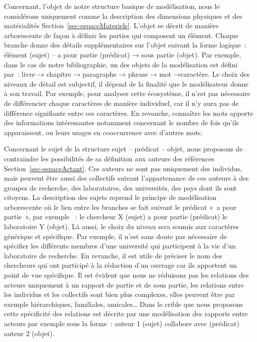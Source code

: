 \documentclass[
  letterpaper,
  DIV=11,
  numbers=noendperiod]{scrreprt}
\begin{document}
Concernant, l'objet de notre structure basique de modélisation, nous le
considérons uniquement comme la description des dimensions physiques et
des matérialités Section~\ref{sec-espaceMateriels}. L'objet se décrit de
manière arborescente de façon à définir les parties qui composent un
élément. Chaque branche donne des détails supplémentaires sur l'objet
suivant la forme logique~: élément (sujet) -- a pour partie (prédicat) →
sous partie (objet). Par exemple, dans le cas de notre bibliographie, un
des objets de la modélisation est défini par~: livre → chapitre →
paragraphe → phrase → mot →caractère. Le choix des niveaux de détail est
subjectif, il dépend de la finalité que le modélisateur donne à son
travail. Par exemple, pour analyser cette écosystème, il n'est pas
nécessaire de différencier chaque caractères de manière individuel, car
il n'y aura pas de différence signifiante entre ces caractères. En
revanche, connaître les mots apporte des informations intéressantes
notamment concernant le nombre de fois qu'ils apparaissent, ou leurs
usages en cooccurrence avec d'autres mots.

Concernant le sujet de la structure sujet -- prédicat -- objet, nous
proposons de contraindre les possibilités de sa définition aux auteurs
des références Section~\ref{sec-espaceActant}. Ces auteurs ne sont pas
uniquement des individus, mais peuvent être aussi des collectifs suivant
l'appartenance de ces auteurs à des groupes de recherche, des
laboratoires, des universités, des pays dont ils sont citoyens. La
description des sujets reprend le principe de modélisation arborescente
où le lien entre les branches se fait suivant le prédicat «~a pour
partie~», par exemple ~: le chercheur X (sujet) a pour partie (prédicat)
le laboratoire Y (objet). Là aussi, le choix du niveau sera soumis aux
caractères générique et spécifique. Par exemple, il n'est sans doute pas
nécessaire de spécifier les différents membres d'une université qui
participent à la vie d'un laboratoire de recherche. En revanche, il est
utile de préciser le nom des chercheurs qui ont participé à la rédaction
d'un ouvrage car ils apportent un point de vue spécifique. Il est
évident que nous ne réduisons pas les relations des acteurs uniquement à
un rapport de partie et de sous partie, les relations entre les
individus et les collectifs sont bien plus complexes, elles peuvent être
par exemple hiérarchiques, familiales, amicales\ldots{} Dans le crible
que nous proposons cette spécificité des relations est décrite par une
modélisation des rapports entre acteurs par exemple sous la forme~:
auteur 1 (sujet) collabore avec (prédicat) auteur 2 (objet).
\end{document}

